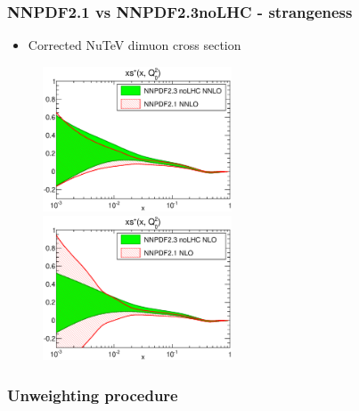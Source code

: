 \documentclass[10pt]{beamer}
\begin{document}
\begin{frame}
\frametitle{NNPDF2.1 vs NNPDF2.3noLHC  -  strangeness}
 \begin{itemize}
 \item<1-> Corrected NuTeV dimuon cross section
 \end{itemize}
 
 \begin{figure}[b!]
    \begin{center}
      \includegraphics[width=0.50\textwidth]{xsp_Q_2_log-21-vs-23noLHC-nnlo.eps}
      \includegraphics[width=0.50\textwidth]{xsp_Q_2_log-21-vs-23noLHC.eps}
    \end{center}
    \vskip-0.5cm
\end{figure}
 
 
 \end{frame}

\begin{frame}
\frametitle{Unweighting procedure}
\begin{columns}
  \begin{column}{0.5\textwidth}
\begin{figure}
  \\
\end{figure}
  \end{column}
  \begin{column}{0.5\textwidth}
\begin{figure}
\end{figure}
  \end{column}
\end{columns}
\end{frame}


\end{document}
